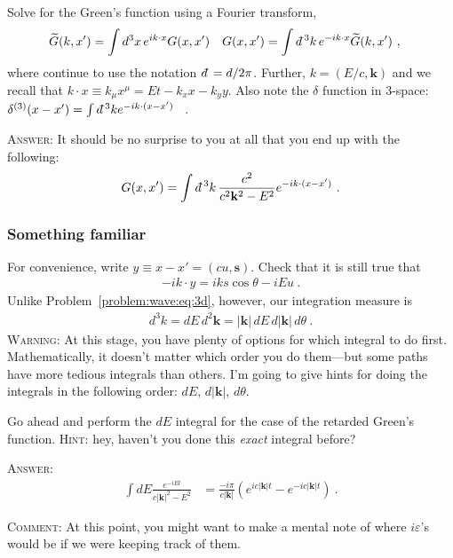 \documentclass[12pt]{article}
\numberwithin{equation}{subsection}    %
\renewcommand{\tilde}{\widetilde}   %
\renewcommand{\vec}[1]{\mathbf{#1}} %
\newcommand{\dbar}{d\mkern-6mu\mathchar'26}    %
\begin{document}
Solve for the Green's function using a Fourier transform,
\begin{align}
	\tilde G(k,x') &= \int d^3x \, e^{ik\cdot x} G(x,x')
	&
	G(x,x') &= \int \dbar^3k \, e^{-ik\cdot x} \tilde G(k,x') \ ,
\end{align}
where continue to use the notation $\dbar = d/2\pi$. Further, $k = (E/c,\vec k)$ and we recall that $k\cdot x \equiv k_\mu x^\mu = Et - k_x x - k_y y$. Also note the $\delta$ function in 3-space: $\delta^{(3)}(x-x') = \int \dbar^3 k e^{-ik\cdot (x-x')}$ \ .

\textsc{Answer:} It should be no surprise to you at all that you end up with the following:
\begin{align}
	G(x,x') = \int \dbar^3k \, \frac{c^2}{c^2 \vec k^2 - E^2} e^{-ik\cdot (x-x')} \ .
	\label{eq:G:ft}
\end{align} 


\subsubsection{Something familiar}

For convenience, write $y \equiv x-x' = (cu,\mathbf{s})$. Check that it is still true that
\begin{align}
	-ik\cdot y = i k s \cos \theta  - i E u \ .
\end{align}
Unlike Problem~\ref{problem:wave:eq:3d}, however, our integration measure is
\begin{align}
	d^3 k = dE \, d^2\vec k = |\vec k| \,dE \,  d|\vec k| \, d \theta  \ .
\end{align}
\textsc{Warning:} At this stage, you have plenty of options for which integral to do first. Mathematically, it doesn't matter which order you do them---but some paths have more tedious integrals than others. I'm going to give hints for doing the integrals in the following order: $dE$, $d|\vec k|$, $d\theta$. 


Go ahead and perform the $dE$ integral for the case of the retarded Green's function. \textsc{Hint}: hey, haven't you done this \emph{exact} integral before? 

\textsc{Answer}:
\begin{align}
\int dE \frac{e^{-iEt}}{c|\vec k|^2 -E^2}
&=
\frac{-i\pi}{c|\vec k|} 
\left(
e^{ic|\vec k| t}
-
e^{-ic|\vec k| t}
\right) \ .
\label{eq:dE}
\end{align}

\textsc{Comment}: At this point, you might want to make a mental note of where $i\varepsilon$'s would be if we were keeping track of them.
\end{document}
